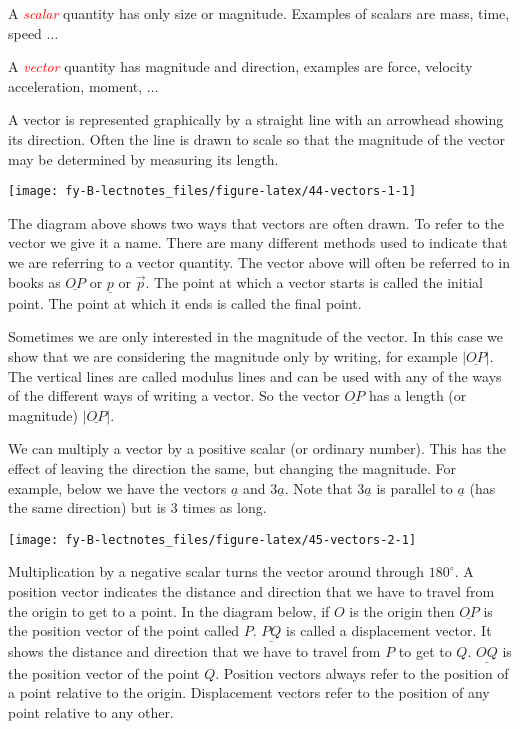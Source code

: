\documentclass[
  11pt,
  oneside]{book}
\theoremstyle{definition}
\theoremstyle{definition}
\theoremstyle{definition}
\theoremstyle{definition}
\theoremstyle{remark}
\begin{document}
A \textcolor{red}{\em scalar} quantity has only size or magnitude. Examples of scalars are mass, time, speed \(\ldots\)

A \textcolor{red}{\em vector} quantity has magnitude and direction, examples are force, velocity acceleration, moment, \(\ldots\)

A vector is represented graphically by a straight line with an arrowhead showing its direction. Often the line is drawn to scale so that the magnitude of the vector may be determined by measuring its length.

\begin{center}\texttt{[image: fy-B-lectnotes\_files/figure-latex/44-vectors-1-1]} \end{center}

The diagram above shows two ways that vectors are often drawn. To refer to the vector we give it a name. There are many different methods used to indicate that we are referring to a vector quantity. The vector above will often be referred to in books as \(\underline{OP}\) or \(\underline p\) or \(\vec{p}\). The point at which a vector starts is called the initial point. The point at which it ends is called the final point.

Sometimes we are only interested in the magnitude of the vector. In this case we show that we are considering the magnitude only by writing, for example \(|\underline{OP}|\). The vertical lines are called modulus lines and can be used with any of the ways of the different ways of writing a vector. So the vector \(\underline{OP}\) has a length (or magnitude) \(|\underline{OP}|\).

We can multiply a vector by a positive scalar (or ordinary number). This has the effect of leaving the direction the same, but changing the magnitude. For example, below we have the vectors \(\underline a\) and \(3\underline a\). Note that \(3\underline a\) is parallel to \(\underline a\) (has the same direction) but is \(3\) times as long.

\begin{center}\texttt{[image: fy-B-lectnotes\_files/figure-latex/45-vectors-2-1]} \end{center}

Multiplication by a negative scalar turns the vector around through \(180^\circ\). A position vector indicates the distance and direction that we have to travel from the origin to get to a point. In the diagram below, if \(O\) is the origin then \(\underline{OP}\) is the position vector of the point called \(P\). \(\underline{PQ}\) is called a displacement vector. It shows the distance and direction that we have to travel from \(P\) to get to \(Q\). \(\underline{OQ}\) is the position vector of the point \(Q\). Position vectors always refer to the position of a point relative to the origin. Displacement vectors refer to the position of any point relative to any other.
\end{document}
